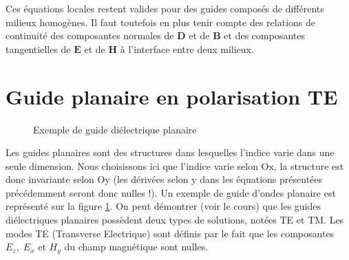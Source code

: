 \documentclass[a4paper, 12pt]{article}
\begin{document}
Ces équations locales restent valides pour des guides composés de différents milieux homogènes. Il faut toutefois en plus tenir compte des relations
de continuité des composantes normales de $ \textbf{D}$ et de $ \textbf{B}$
et des composantes tangentielles de $\textbf{E}$ et de $ \textbf{H}$ à l'interface entre deux milieux.

\section{Guide planaire en polarisation TE}

\begin{figure}[!h]
\centering
{}
\caption[]{Exemple de guide diélectrique planaire}%
\label{fig:chemin}%
\end{figure}

Les guides planaires sont des structures dans lesquelles l'indice varie dans une seule dimension. Nous choisissons ici que l'indice varie selon Ox, la structure est donc invariante selon Oy (les dérivées selon y dans les équations présentées précédemment seront donc nulles !). Un exemple de guide d'ondes planaire est représenté sur la figure \ref{fig:chemin}. On peut démontrer (voir le cours) que les guides diélectriques planaires possèdent deux types de solutions, notées TE et TM. Les modes TE (Transverse Electrique) sont définis par le fait que les composantes $E_z, \; E_x$ et $ H_y$ du champ magnétique sont nulles.
\end{document}
